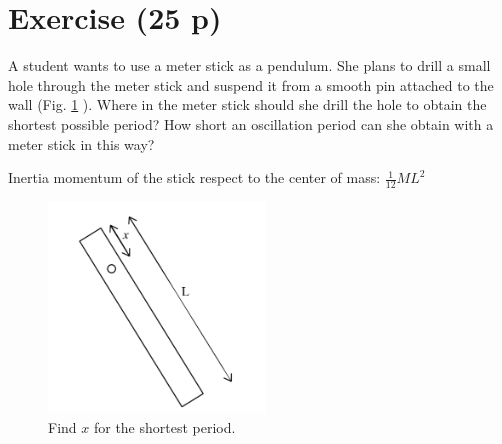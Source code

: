 \documentclass[12pt]{article}
\begin{document}
\section*{Exercise \theexample (25 p)}

A student wants to use a meter stick as a pendulum.
She plans to drill a small hole through the meter stick
and suspend it from a smooth pin
attached to the wall (Fig. \ref{image3} ).
Where in the meter stick should
she drill the hole to obtain the
shortest possible period? How
short an oscillation period can she 
obtain with a meter stick in this
way? 
\vspace{2mm}

Inertia momentum of the stick respect to the center of mass: $\frac{1}{12}ML^2$


\begin{figure}[h!]
  \begin{center}
    \includegraphics[height=2.2in]{images/3.jpg}
  \end{center}
  \caption{Find $x$ for the shortest period. }
  \label{image3}
\end{figure}



\end{document}
